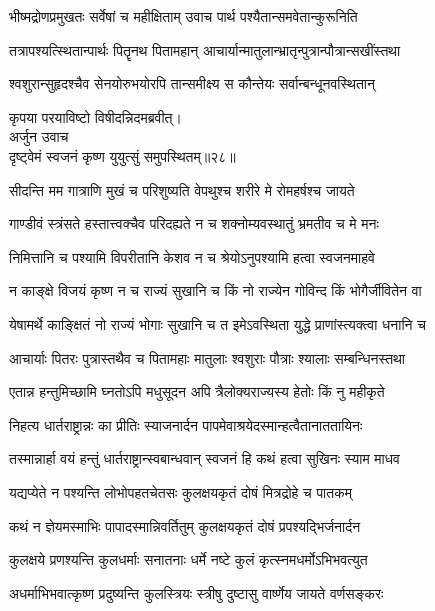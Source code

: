 \twolineshloka
{भीष्मद्रोणप्रमुखतः सर्वेषां च महीक्षिताम्}
{उवाच पार्थ पश्यैतान्समवेतान्कुरूनिति}%

\twolineshloka
{तत्रापश्यत्स्थितान्पार्थः पितॄनथ पितामहान्}
{आचार्यान्मातुलान्भ्रातृन्पुत्रान्पौत्रान्सखींस्तथा}%

\twolineshloka
{श्वशुरान्सुहृदश्चैव सेनयोरुभयोरपि}
{तान्समीक्ष्य स कौन्तेयः सर्वान्बन्धूनवस्थितान्}%

{कृपया परयाविष्टो विषीदन्निदमब्रवीत्।}\\
{अर्जुन उवाच}\\
{दृष्ट्वेमं स्वजनं कृष्ण युयुत्सुं समुपस्थितम्॥२८॥}%

\twolineshloka
{सीदन्ति मम गात्राणि मुखं च परिशुष्यति}
{वेपथुश्च शरीरे मे रोमहर्षश्च जायते}%

\twolineshloka
{गाण्डीवं स्त्रंसते हस्तात्त्वक्चैव परिदह्यते}
{न च शक्नोम्यवस्थातुं भ्रमतीव च मे मनः}%

\twolineshloka
{निमित्तानि च पश्यामि विपरीतानि केशव}
{न च श्रेयोऽनुपश्यामि हत्वा स्वजनमाहवे}%

\twolineshloka
{न काङ्क्षे विजयं कृष्ण न च राज्यं सुखानि च}
{किं नो राज्येन गोविन्द किं भोगैर्जीवितेन वा}%

\twolineshloka
{येषामर्थे काङ्क्षितं नो राज्यं भोगाः सुखानि च}
{त इमेऽवस्थिता युद्धे प्राणांस्त्यक्त्वा धनानि च}%

\twolineshloka
{आचार्याः पितरः पुत्रास्तथैव च पितामहाः}
{मातुलाः श्वशुराः पौत्राः श्यालाः सम्बन्धिनस्तथा}%

\twolineshloka
{एतान्न हन्तुमिच्छामि घ्नतोऽपि मधुसूदन}
{अपि त्रैलोक्यराज्यस्य हेतोः किं नु महीकृते}%

\twolineshloka
{निहत्य धार्तराष्ट्रान्नः का प्रीतिः स्याजनार्दन}
{पापमेवाश्रयेदस्मान्हत्वैतानाततायिनः}%

\twolineshloka
{तस्मान्नार्हा वयं हन्तुं धार्तराष्ट्रान्स्वबान्धवान्}
{स्वजनं हि कथं हत्वा सुखिनः स्याम माधव}%

\twolineshloka
{यद्यप्येते न पश्यन्ति लोभोपहतचेतसः}
{कुलक्षयकृतं दोषं मित्रद्रोहे च पातकम्}%

\twolineshloka
{कथं न ज्ञेयमस्माभिः पापादस्मान्निवर्तितुम्}
{कुलक्षयकृतं दोषं प्रपश्यद्भिर्जनार्दन}%

\twolineshloka
{कुलक्षये प्रणश्यन्ति कुलधर्माः सनातनाः}
{धर्मे नष्टे कुलं कृत्स्नमधर्मोऽभिभवत्युत}%

\twolineshloka
{अधर्माभिभवात्कृष्ण प्रदुष्यन्ति कुलस्त्रियः}
{स्त्रीषु दुष्टासु वार्ष्णेय जायते वर्णसङ्करः}%

